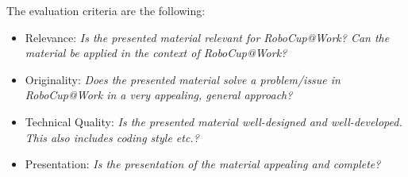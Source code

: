 The evaluation criteria are the following:

\begin{itemize}
	\item Relevance: \emph{Is the presented material relevant for RoboCup@Work? Can the material be applied in the context of RoboCup@Work?}
	\item Originality: \emph{Does the presented material solve a problem/issue in RoboCup@Work in a very appealing, general approach?} 
	\item Technical Quality: \emph{Is the presented material well-designed and well-developed. This also includes coding style etc.? }
	\item Presentation: \emph{Is the presentation of the material appealing and complete?}
\end{itemize}


